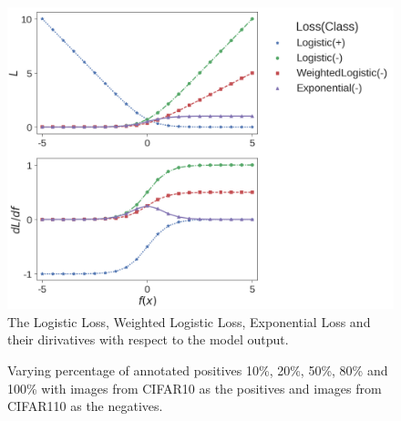 \begin{figure}[t]
\centering
   \includegraphics[width=0.95\linewidth]{img/losses.png}
\caption{The Logistic Loss, Weighted Logistic Loss, Exponential Loss and their dirivatives with respect to the model output.}
\label{fig:losses}
\end{figure}


\begin{figure}[t]
\centering
\fbox{\rule{0pt}{2in} \rule{0.9\linewidth}{0pt}}
\caption{Varying percentage of annotated positives 10\%, 20\%, 50\%, 80\% and 100\% with images from CIFAR10 as the positives and images from CIFAR110 as the negatives.}
\label{fig:pct_annotating}
\end{figure}

\begin{table}[t]
\caption{Image classification with positive examples partially annotated. The complete dataset contains images from CIFAR10 as the \textbf{positive} (P) set and images from CIFAR110 as the \textbf{negative} (N) set. The unannotated positive examples from P set construct the \textbf{unlabeled} (U) set together with the N set.}
\end{table}



